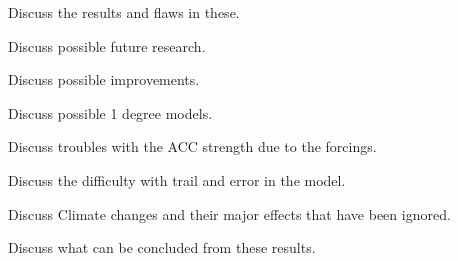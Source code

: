 
Discuss the results and flaws in these.

Discuss possible future research.

Discuss possible improvements.

Discuss possible 1 degree models.

Discuss troubles with the ACC strength due to the forcings.

Discuss the difficulty with trail and error in the model.

Discuss Climate changes and their major effects that have been ignored.

Discuss what can be concluded from these results.

